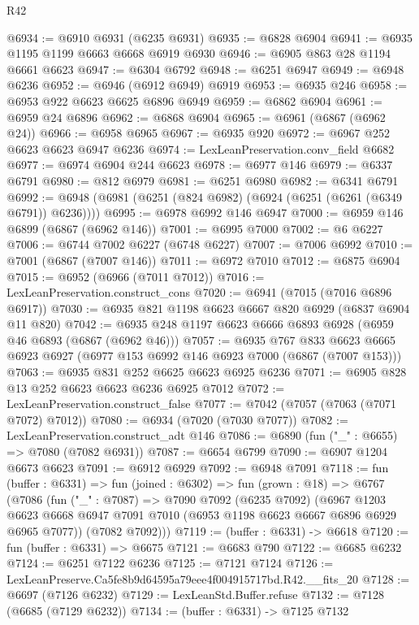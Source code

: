 \begin{lexlean}{R42}
\begin{coremodule}
{@6934 := @6910 @6931 (@6235 @6931)
@6935 := @6828 @6904
@6941 := @6935 @1195 @1199 @6663 @6668 @6919 @6930
@6946 := @6905 @863 @28 @1194 @6661 @6623
@6947 := @6304 @6792
@6948 := @6251 @6947
@6949 := @6948 @6236
@6952 := @6946 (@6912 @6949) @6919
@6953 := @6935 @246
@6958 := @6953 @922 @6623 @6625 @6896 @6949
@6959 := @6862 @6904
@6961 := @6959 @24 @6896
@6962 := @6868 @6904
@6965 := @6961 (@6867 (@6962 @24))
@6966 := @6958 @6965
@6967 := @6935 @920
@6972 := @6967 @252 @6623 @6623 @6947 @6236
@6974 := LexLeanPreservation.conv_field @6682
@6977 := @6974 @6904 @244 @6623
@6978 := @6977 @146
@6979 := @6337 @6791
@6980 := @812 @6979
@6981 := @6251 @6980
@6982 := @6341 @6791
@6992 := @6948 (@6981 (@6251 (@824 @6982) (@6924 (@6251 (@6261 (@6349 @6791)) @6236))))
@6995 := @6978 @6992 @146 @6947
@7000 := @6959 @146 @6899 (@6867 (@6962 @146))
@7001 := @6995 @7000
@7002 := @6 @6227
@7006 := @6744 @7002 @6227 (@6748 @6227)
@7007 := @7006 @6992
@7010 := @7001 (@6867 (@7007 @146))
@7011 := @6972 @7010
@7012 := @6875 @6904
@7015 := @6952 (@6966 (@7011 @7012))
@7016 := LexLeanPreservation.construct_cons
@7020 := @6941 (@7015 (@7016 @6896 @6917))
@7030 := @6935 @821 @1198 @6623 @6667 @820 @6929 (@6837 @6904 @11 @820)
@7042 := @6935 @248 @1197 @6623 @6666 @6893 @6928 (@6959 @46 @6893 (@6867 (@6962 @46)))
@7057 := @6935
    @767
    @833
    @6623
    @6665
    @6923
    @6927
    (@6977 @153 @6992 @146 @6923 @7000 (@6867 (@7007 @153)))
@7063 := @6935 @831 @252 @6625 @6623 @6925 @6236
@7071 := @6905 @828 @13 @252 @6623 @6623 @6236 @6925 @7012
@7072 := LexLeanPreservation.construct_false
@7077 := @7042 (@7057 (@7063 (@7071 @7072) @7012))
@7080 := @6934 (@7020 (@7030 @7077))
@7082 := LexLeanPreservation.construct_adt @146
@7086 := @6890 (fun ("_" : @6655) => @7080 (@7082 @6931))
@7087 := @6654 @6799
@7090 := @6907 @1204 @6673 @6623
@7091 := @6912 @6929
@7092 := @6948 @7091
@7118 := fun (buffer : @6331) =>
  fun (joined : @6302) =>
  fun (grown : @18) =>
  @6767
    (@7086
      (fun ("_" : @7087) =>
      @7090
        @7092
        (@6235 @7092)
        (@6967
          @1203
          @6623
          @6668
          @6947
          @7091
          @7010
          (@6953 @1198 @6623 @6667 @6896 @6929 @6965 @7077))
        (@7082 @7092)))
@7119 := (buffer : @6331) -> @6618
@7120 := fun (buffer : @6331) => @6675
@7121 := @6683 @790
@7122 := @6685 @6232
@7124 := @6251 @7122 @6236
@7125 := @7121 @7124
@7126 := LexLeanPreserve.Ca5fe8b9d64595a79eee4f004915717bd.R42.__fits_20
@7128 := @6697 (@7126 @6232)
@7129 := LexLeanStd.Buffer.refuse
@7132 := @7128 (@6685 (@7129 @6232))
@7134 := (buffer : @6331) -> @7125 @7132
}
\end{coremodule}
\end{lexlean}
